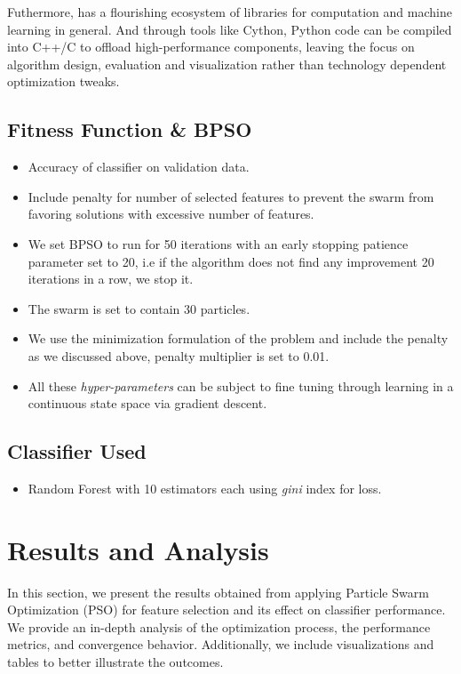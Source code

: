 \documentclass[12pt]{article}
\begin{document}
Futhermore, has a flourishing ecosystem of libraries for computation and machine learning in general. And through tools like Cython, Python code can be compiled into C++/C to offload high-performance components, leaving the focus on algorithm design, evaluation and visualization rather than technology dependent optimization tweaks.


\subsection{Fitness Function \& BPSO}
\begin{itemize}
    \item Accuracy of classifier on validation data.
    \item Include penalty for number of selected features to prevent the swarm from favoring solutions with excessive number of features.
    \item We set BPSO to run for 50 iterations with an early stopping patience parameter set to 20, i.e if the algorithm does not find any improvement 20 iterations in a row, we stop it.
    \item The swarm is set to contain 30 particles.
    \item We use the minimization formulation of the problem and include the penalty as we discussed above, penalty multiplier is set to 0.01.
    \item All these \textit{hyper-parameters} can be subject to fine tuning through learning in a continuous state space via gradient descent.
\end{itemize}

\subsection{Classifier Used}
\begin{itemize}
    \item Random Forest with 10 estimators each using \textit{gini} index for loss.
\end{itemize}
\newpage
\section{Results and Analysis}

In this section, we present the results obtained from applying Particle Swarm Optimization (PSO) for feature selection and its effect on classifier performance. We provide an in-depth analysis of the optimization process, the performance metrics, and convergence behavior. Additionally, we include visualizations and tables to better illustrate the outcomes.
\end{document}
